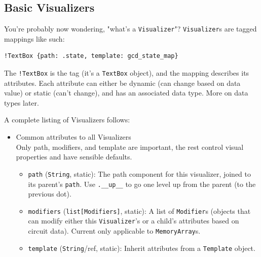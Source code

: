\documentclass[11pt]{article}
\begin{document}
\subsection{Basic Visualizers}
You're probably now wondering, "what's a \texttt{Visualizer}"? \texttt{Visualizer}s are tagged mappings like such:
\begin{verbatim}
!TextBox {path: .state, template: gcd_state_map}
\end{verbatim}
The \texttt{!TextBox} is the tag (it's a \texttt{TextBox} object), and the mapping describes its attributes. Each attribute can either be dynamic (can change based on data value) or static (can't change), and has an associated data type. More on data types later.

A complete listing of Visualizers follows:
\begin{itemize}
  \item Common attributes to all Visualizers \\
  Only path, modifiers, and template are important, the rest control visual properties and have sensible defaults.
  \begin{itemize}
    \item \texttt{path} (\texttt{String}, static): The path component for this visualizer, joined to its parent's \texttt{path}. Use \texttt{.\_\_up\_\_} to go one level up from the parent (to the previous dot).
    \item \texttt{modifiers} (\texttt{list[Modifiers]}, static): A list of \texttt{Modifier}s (objects that can modify either this \texttt{Visualizer}'s or a child's attributes based on circuit data). Current only applicable to \texttt{MemoryArray}s.
    \item \texttt{template} (\texttt{String}/ref, static): Inherit attributes from a \texttt{Template} object.
    

\end{itemize}
\end{itemize}
\end{document}
